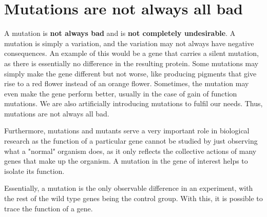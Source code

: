 \documentclass[11pt]{article}
\begin{document}
\newpage
\section{Mutations are not always all bad}
\label{sec:org0b86653}
A mutation is \textbf{not always bad} and is \textbf{not completely undesirable}. A mutation is simply a variation, and the variation may not always have negative consequences. An example of this would be a gene that carries a silent mutation, as there is essentially no difference in the resulting protein. Some mutations may simply make the gene different but not worse, like producing pigments that give rise to a red flower instead of an orange flower. Sometimes, the mutation may even make the gene perform better, usually in the case of gain of function mutations. We are also artificially introducing mutations to fulfil our needs. Thus, mutations are not always all bad.


Furthermore, mutations and mutants serve a very important role in biological research as the function of a particular gene cannot be studied by just observing what a "normal" organism does, as it only reflects the collective actions of many genes that make up the organism. A mutation in the gene of interest helps to isolate its function.


Essentially, a mutation is the only observable difference in an experiment, with the rest of the wild type genes being the control group. With this, it is possible to trace the function of a gene.
\end{document}
